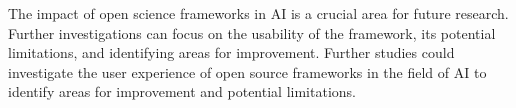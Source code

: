 The impact of open science frameworks in AI is a crucial area for future research. Further investigations can focus on the usability of the framework, its potential limitations, and identifying areas for improvement. Further studies could investigate the user experience of open source frameworks in the field of AI to identify areas for improvement and potential limitations.

 
